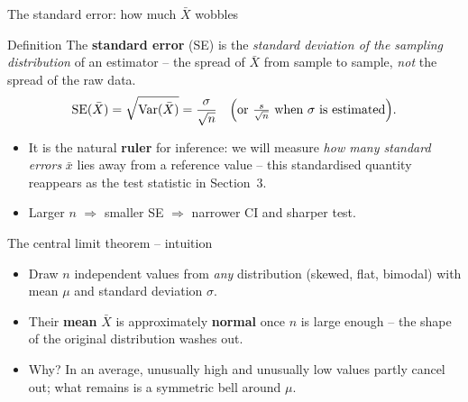 \documentclass[aspectratio=169,11pt]{beamer}
\begin{document}
\begin{frame}{The standard error: how much $\bar X$ wobbles}
  \begin{block}{Definition}
    The \textbf{standard error} (SE) is the \emph{standard deviation of the
    sampling distribution} of an estimator -- the spread of $\bar X$ from
    sample to sample, \emph{not} the spread of the raw data.
    \[
      \mathrm{SE}(\bar X)=\sqrt{\mathrm{Var}(\bar X)}=\frac{\sigma}{\sqrt n}\quad
      \Bigl(\text{or }\tfrac{s}{\sqrt n}\text{ when }\sigma\text{ is estimated}\Bigr).
    \]
  \end{block}
  \begin{itemize}\setlength{\itemsep}{2pt}
    \item It is the natural \textbf{ruler} for inference: we will measure
          \emph{how many standard errors} $\bar x$ lies away from a reference
          value -- this standardised quantity reappears as the test statistic
          in Section~3.
    \item Larger $n$ $\Rightarrow$ smaller SE $\Rightarrow$ narrower CI and
          sharper test.
  \end{itemize}
\end{frame}

\begin{frame}{The central limit theorem -- intuition}
  \begin{itemize}\setlength{\itemsep}{2pt}
    \item Draw $n$ independent values from \emph{any} distribution (skewed,
          flat, bimodal) with mean $\mu$ and standard deviation $\sigma$.
    \item Their \textbf{mean} $\bar X$ is approximately \textbf{normal} once
          $n$ is large enough -- the shape of the original distribution washes
          out.
    \item Why? In an average, unusually high and unusually low values partly
          cancel out; what remains is a symmetric bell around $\mu$.
  \end{itemize}
\end{frame}
\end{document}
